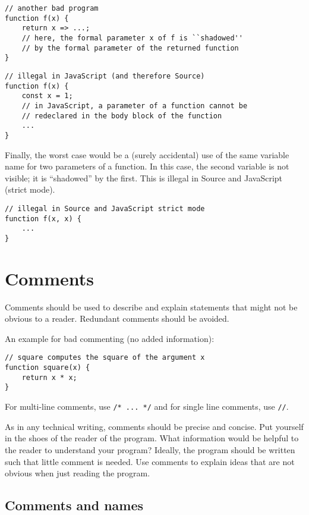\begin{lstlisting}
// another bad program
function f(x) {
    return x => ...;
    // here, the formal parameter x of f is ``shadowed'' 
    // by the formal parameter of the returned function
}
\end{lstlisting}

\begin{lstlisting}
// illegal in JavaScript (and therefore Source)
function f(x) {
    const x = 1;
    // in JavaScript, a parameter of a function cannot be 
    // redeclared in the body block of the function
    ...
}
\end{lstlisting}
Finally, the worst case would be a (surely accidental) 
use of the same variable name for two parameters of a function.
In this case, the second variable is not visible; it is ``shadowed''
by the first. This is illegal in Source and JavaScript (strict mode).
\begin{lstlisting}
// illegal in Source and JavaScript strict mode
function f(x, x) {
    ...
}
\end{lstlisting}

\vspace{-4mm}

\section*{Comments}
Comments should be used to describe and explain statements 
that might not be obvious to a reader.
Redundant comments should be avoided. 

An example for bad commenting (no added information):
\begin{lstlisting}
// square computes the square of the argument x
function square(x) {
    return x * x;
}
\end{lstlisting}
%
For multi-line comments, use \lstinline{/* ... */} and for single line comments, use \lstinline{//}.

As in any technical writing, comments should be precise and concise. Put yourself in the
shoes of the reader of the program. What information would be helpful to the reader to
understand your program? Ideally, the program should be written such that little comment is
needed. Use comments to explain ideas that are not obvious when just reading the program.

\subsection*{Comments and names}

